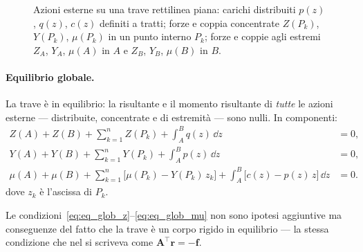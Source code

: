 \begin{figure}[htbp]
	\caption{Azioni esterne su una trave rettilinea piana:
		carichi distribuiti $p(z)$, $q(z)$, $c(z)$ definiti
		a tratti; forze e coppia concentrate $Z(P_k)$, $Y(P_k)$,
		$\mu(P_k)$ in un punto interno $P_k$; forze e coppie
		agli estremi $Z_A$, $Y_A$, $\mu(A)$ in $A$ e
		$Z_B$, $Y_B$, $\mu(B)$ in $B$.}
	\label{fig:azioni_esterne}
\end{figure}


\paragraph{Equilibrio globale.}
La trave è in equilibrio: la risultante e il momento
risultante di \emph{tutte} le azioni esterne ---
distribuite, concentrate e di estremità --- sono
nulli. In componenti:
\begin{align}
	Z(A) + Z(B) + \sum_{k=1}^{n} Z(P_k)
	+ \int_A^B q(z)\,\dd z &= 0,
	\label{eq:eq_glob_z}\\
	Y(A) + Y(B) + \sum_{k=1}^{n} Y(P_k)
	+ \int_A^B p(z)\,\dd z &= 0,
	\label{eq:eq_glob_y}\\
	\mu(A) + \mu(B)
	+ \sum_{k=1}^{n}\bigl[\mu(P_k)
	- Y(P_k)\,z_k\bigr]
	+ \int_A^B \bigl[c(z)
	- p(z)\,z\bigr]\,\dd z &= 0.
	\label{eq:eq_glob_mu}
\end{align}
dove $z_k$ è l'ascissa di $P_k$.

\begin{oss}
	Le condizioni~\eqref{eq:eq_glob_z}--\eqref{eq:eq_glob_mu}
	non sono ipotesi aggiuntive ma conseguenze del
	fatto che la trave è un corpo rigido in equilibrio
	--- la stessa condizione che nel
	 si scriveva
	come $\bm{A}^{\top}\bm{r} = -\bm{f}$.
\end{oss}



